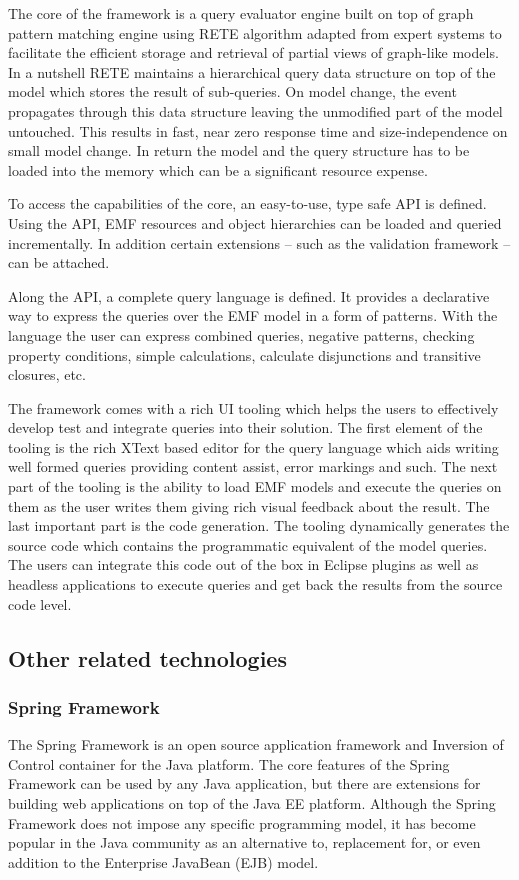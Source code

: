 The core of the framework is a query evaluator engine built on top of graph
pattern matching engine using RETE \cite{RETE} algorithm adapted from expert
systems to facilitate the efficient storage and retrieval of partial views of
graph-like models. In a nutshell RETE maintains a hierarchical query data
structure on top of the model which stores the result of sub-queries. On model
change, the event propagates through this data structure leaving the unmodified
part of the model untouched. This results in fast, near zero response time and
size-independence on small model change. In return the model and the query
structure has to be loaded into the memory which can be a significant resource
expense.

To access the capabilities of the core, an easy-to-use, type safe API is
defined. Using the API, EMF resources and object hierarchies can be loaded and
queried incrementally. In addition certain extensions -- such as the validation
framework -- can be attached.

Along the API, a complete query language is defined. It provides a declarative
way to express the queries over the EMF model in a form of patterns. With the
language the user can express combined queries, negative patterns, checking
property conditions, simple calculations, calculate disjunctions and transitive
closures, etc.

The framework comes with a rich UI tooling which helps the users to effectively
develop test and integrate queries into their solution. The first element of the
tooling is the rich XText based editor for the query language which aids writing
well formed queries providing content assist, error markings and such. The next
part of the tooling is the ability to load EMF models and execute the queries on
them as the user writes them giving rich visual feedback about the result.
The last important part is the code generation. The tooling dynamically
generates the source code which contains the programmatic equivalent of the
model queries. The users can integrate this code out of the box in Eclipse
plugins as well as headless applications to execute queries and get back the
results from the source code level.

\subsection{Other related technologies}

\subsubsection{Spring Framework}
%
The Spring Framework is an open source application framework and Inversion of
Control container for the Java platform. The core features of the Spring
Framework can be used by any Java application, but there are extensions for
building web applications on top of the Java EE platform. Although the Spring
Framework does not impose any specific programming model, it has become popular
in the Java community as an alternative to, replacement for, or even addition to
the Enterprise JavaBean (EJB) model.

